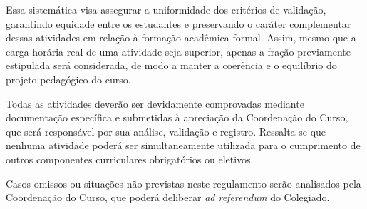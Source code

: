 Essa sistemática visa assegurar a uniformidade dos critérios de validação, garantindo equidade entre os estudantes e preservando o caráter complementar dessas atividades em relação à formação acadêmica formal. Assim, mesmo que a carga horária real de uma atividade seja superior, apenas a fração previamente estipulada será considerada, de modo a manter a coerência e o equilíbrio do projeto pedagógico do curso.

Todas as atividades deverão ser devidamente comprovadas mediante documentação específica e submetidas à apreciação da Coordenação do Curso, que será responsável por sua análise, validação e registro. Ressalta-se que nenhuma atividade poderá ser simultaneamente utilizada para o cumprimento de outros componentes curriculares obrigatórios ou eletivos.

Casos omissos ou situações não previstas neste regulamento serão analisados pela Coordenação do Curso, que poderá deliberar \textit{ad referendum} do Colegiado.


